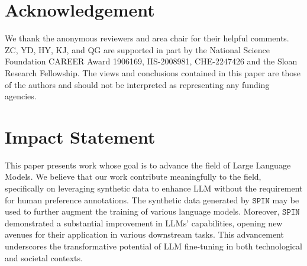 \documentclass{article}
\newcommand{\method}{\texttt{SPIN}}
\begin{document}
\section*{Acknowledgement}
We thank the anonymous reviewers and area chair for their helpful comments. ZC, YD, HY, KJ, and QG are supported in part by the National Science Foundation CAREER Award 1906169, IIS-2008981, CHE-2247426 and the Sloan Research Fellowship. The views and conclusions contained in this paper are those of the authors and should not be interpreted as representing any funding agencies.


 \section*{Impact Statement}

This paper presents work whose goal is to advance the field of Large Language Models. 
We believe that our work contribute meaningfully to the field, specifically on leveraging synthetic data to enhance LLM without the requirement for human preference annotations. 
The synthetic data generated by $\method$ may be used to further augment the training of various language models.
Moreover, $\method$ demonstrated a substantial improvement in LLMs' capabilities, opening new avenues for their application in various downstream tasks. 
This advancement underscores the transformative potential of LLM fine-tuning in both technological and societal contexts.







\newpage
\appendix
\onecolumn
\end{document}

